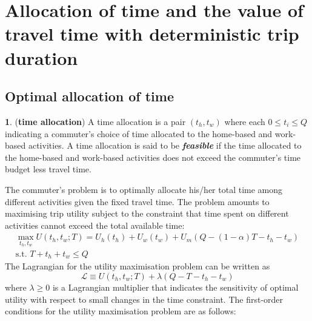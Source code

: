 \documentclass[12pt,a4paper,british]{article}
\theoremstyle{definition}
\newtheorem{defn}{\protect\definitionname}
\theoremstyle{plain}
\theoremstyle{plain}
\providecommand{\definitionname}{Definition}
\begin{document}
\section{Allocation of time and the value of travel time with deterministic trip duration}

\subsection{Optimal allocation of time}
\begin{defn}
(\textbf{time allocation}) A time allocation is a pair $\left(t_{h},t_{w}\right)$ where each $0\leq t_{i}\leq Q$ indicating a commuter's choice of time allocated to the home-based and work-based activities. A time allocation is said to be \textbf{\textit{feasible}} if the time allocated to the home-based and work-based activities does not exceed the commuter's time budget less travel time.
\end{defn}
The commuter's problem is to optimally allocate his/her total time among different activities given the fixed travel time. The problem
amounts to maximising trip utility subject to the constraint that time spent on different activities cannot exceed the total available
time:
\begin{gather*}
\max_{t_{h},t_{w}}U\left(t_{h},t_{w};T\right)=U_{h}\left(t_{h}\right)+U_{w}\left(t_{w}\right)+U_{m}\left(Q-\left(1-\alpha\right)T-t_{h}-t_{w}\right)\\
\mbox{s.t. }T+t_{h}+t_{w}\leq Q
\end{gather*}
 The Lagrangian for the utility maximisation problem can be written as
\begin{equation*}
\mathcal{L}\equiv U\left(t_{h},t_{w};T\right)+\lambda\left(Q-T-t_{h}-t_{w}\right)
\end{equation*}%
where $\lambda\geq0$ is a Lagrangian multiplier that indicates the sensitivity of optimal utility with respect to small changes in the time constraint. The first-order conditions for the utility maximisation problem are as follows:
\end{document}
